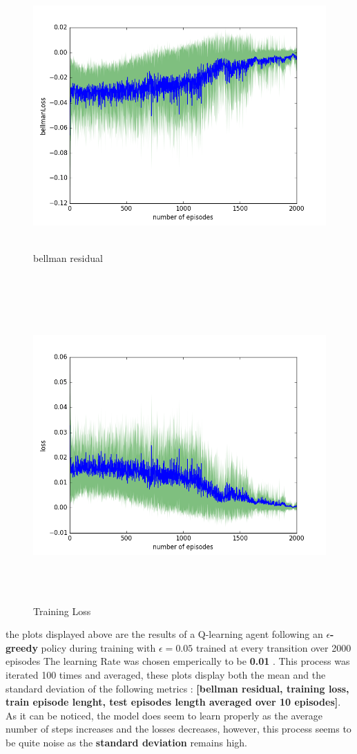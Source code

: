 \documentclass{report}
\begin{document}
\begin{figure}[H]
    \begin{minipage}[c]{.49\linewidth}
        \centering
        \includegraphics[width = \linewidth]{plots/a4/bellmanLoss.png}
        \caption{bellman residual}
    \end{minipage}
    \hfill%
    \begin{minipage}[c]{.49\linewidth}
        \centering
        \includegraphics[width = \linewidth]{plots/a4/loss.png}
        \caption{Training Loss}
    \end{minipage}
\end{figure}


the plots displayed above are the results of a Q-learning agent following an \textbf{$\epsilon$-greedy} policy during training with \textbf{$\epsilon = 0.05$} trained at every transition over 2000 episodes The learning Rate was chosen emperically to be \textbf{0.01} . This process was iterated 100 times and averaged, these plots display both the mean and the standard deviation of the following metrics : \textbf{[bellman residual, training loss, train episode lenght, test episodes length averaged over 10 episodes]}. As it can be noticed, the model does seem to learn properly as the average number of steps increases and the losses decreases, however, this process seems to be quite noise as the \textbf{standard deviation} remains high. 
\end{document}
